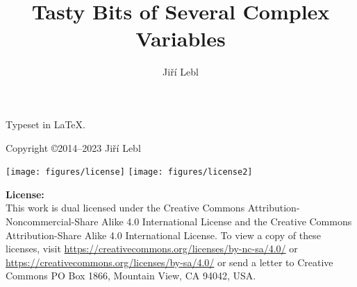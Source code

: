\documentclass[12pt,openany]{book}
\author{Ji\v{r}\'i Lebl}
\title{Tasty Bits of Several Complex Variables}
\theoremstyle{plain}
\theoremstyle{remark}
\theoremstyle{definition}
\theoremstyle{exercise}
\theoremstyle{example}
\begin{document}
\ifpdf
\fi
\newlength{\centeroffset}
\setlength{\centeroffset}{-0.5\oddsidemargin}
\addtolength{\centeroffset}{0.5\evensidemargin}
\thispagestyle{empty}
\noindent\hspace*{\centeroffset}

\noindent\hspace*{\centeroffset}



\pagebreak

\vspace*{\fill}

\noindent
Typeset in \LaTeX.

\bigskip

\noindent
Copyright \copyright 2014--2023 Ji{\v r}\'i Lebl



\bigskip

\noindent
\texttt{[image: figures/license]}
\quad
\texttt{[image: figures/license2]}

\bigskip

\noindent
\textbf{License:}
\\
This work
is dual licensed under
the Creative Commons
Attribution-Non\-commercial-Share Alike 4.0 International License and
the Creative Commons
Attribution-Share Alike 4.0 International License.
To view a
copy of these licenses, visit
\url{https://creativecommons.org/licenses/by-nc-sa/4.0/}
or
\url{https://creativecommons.org/licenses/by-sa/4.0/}
or send a letter to
Creative Commons
PO Box 1866, Mountain View, CA 94042, USA\@.
\end{document}
